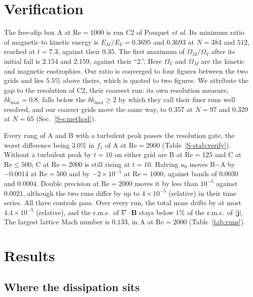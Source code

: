 \documentclass[aip,pop,reprint,amsmath,amssymb,superscriptaddress,floatfix]{revtex4-2}
\newcommand{\Rey}{\mathrm{Re}}
\newcommand{\BB}{\bm{B}}
\begin{document}
\section{Verification}
\label{sec:verify}

The free-slip box A at $\Rey=1000$ is run C2 of Pouquet \textit{et
al.}\cite{pouquet2010} Its minimum ratio of magnetic to kinetic energy is
$E_M/E_V=0.3695$ and $0.3693$ at $N=384$ and $512$, reached at $t=7.3$, against
their $0.35$. The first maximum of $\Omega_M/\Omega_V$ after its initial fall is
$2.154$ and $2.159$, against their ``2.''. Here $\Omega_V$ and $\Omega_M$ are the
kinetic and magnetic enstrophies. Our ratio is converged to four figures between the
two grids and lies $5.5$\% above theirs, which is quoted to two figures. We attribute the gap to the resolution of
C2, their coarsest run: its own resolution measure, $\delta k_{\max}=0.8$, falls
below the $\delta k_{\max}\ge2$ by which they call their finer runs well resolved,
and our coarser grids move the same way, to $0.357$ at $N=97$ and $0.329$ at $N=65$
(Sec.~\ref{S-s:method}).

Every rung of A and B with a turbulent peak passes the resolution gate, the worst
difference being $3.0$\% in $f_1$ of A at $\Rey=2000$ (Table~\ref{S-stab:verify}).
Without a turbulent peak by $t=10$ on either grid are B at $\Rey=125$ and C at
$\Rey\le500$; C at $\Rey=2000$ is still rising at $t=10$. Halving $u_0$ moves B$-$A
by $-0.0014$ at $\Rey=500$ and by $-2\times10^{-5}$ at $\Rey=1000$, against bands of
$0.0030$ and $0.0004$. Double precision at $\Rey=2000$ moves it by less than
$10^{-5}$ against $0.0021$, although the two runs differ by up to $4\times10^{-5}$
(relative) in their time series. All three controls pass. Over every run, the total
mass drifts by at most $4.4\times10^{-5}$ (relative), and the r.m.s.\ of
$\nabla\cdot\BB$ stays below $1$\% of the r.m.s.\ of $|\bm{j}|$. The largest
lattice Mach number is $0.133$, in A at $\Rey=2000$ (Table~\ref{tab:runs}).

\section{Results}
\label{sec:results}

\subsection{Where the dissipation sits}
\label{sec:where}
\end{document}
